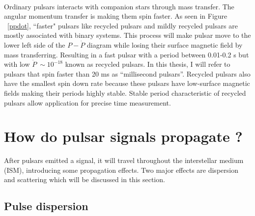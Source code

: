 \documentclass[thesis_msc.tex]{subfiles}
\begin{document}
\paragraph{} Ordinary pulsars interacts with companion stars through mass transfer.  The angular momentum transfer is making them spin faster. As seen in Figure ~\ref{ppdot}, ``faster" pulsars like recycled pulsars and mildly recycled pulsars are mostly associated with binary systems. This process will make pulsar move to the lower left side of the $P-\dot{P}$ diagram while losing their surface magnetic field by mass transferring. Resulting in a fast pulsar with a period between 0.01-0.2 s but with low $\dot{P} ~\sim 10^{-18}$ known as recycled pulsars. In this thesis, I will refer to pulsars that spin faster than 20 ms as ``millisecond pulsars''. Recycled pulsars also have the smallest spin down rate because these pulsars have low-surface magnetic fields making their periods highly stable. Stable period characteristic of recycled pulsars allow application for precise time measurement.  

 \section{How do pulsar signals propagate ?}
 \paragraph{} After pulsars emitted a signal, it will travel throughout the interstellar medium (ISM), introducing some propagation effects. Two major effects are dispersion and scattering which will be discussed in this section.   
    \subsection{Pulse dispersion} \label{Pulse_dispersion}
\end{document}
